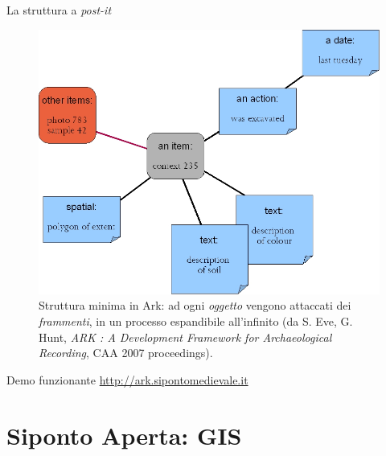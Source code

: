 \documentclass{beamer}
\begin{document}
		\begin{frame}{La struttura a \emph{post-it}}
			\begin{figure}[]
				\begin{center}
					\includegraphics[width=0.8\linewidth]{ark_struct}
				\end{center}
				\caption{Struttura minima in Ark: ad ogni \emph{oggetto} vengono attaccati dei \emph{frammenti}, in un processo espandibile all'infinito (da S. Eve, G.  Hunt, \emph{ARK : A Development Framework for Archaeological Recording}, CAA 2007 proceedings).}
				\label{fig:ark_struct}
			\end{figure}
		\end{frame}

		\begin{frame}{Demo funzionante}
			\centering
			\LARGE{\url{http://ark.sipontomedievale.it}}
		\end{frame}

\part{Siponto Aperta: GIS}
\frame{\partpage}
\end{document}
